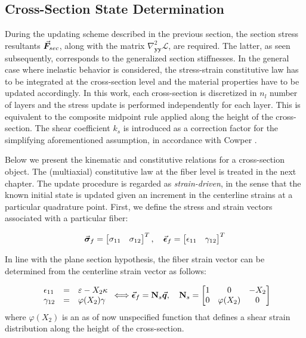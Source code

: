 \subsection{Cross-Section State Determination}\label{subsection:CH2-S4SS5}

During the updating scheme described in the previous section, the section stress
resultants $\vec{\bm{F}}_{sec}$, along with the matrix
$\nabla_{\mathbf{yy}}^2\mathcal{L}$, are required. The latter, as seen
subsequently, corresponds to the generalized section stiffnesses. In the general
case where
inelastic behavior is considered, the stress-strain constitutive law has to be
integrated at the cross-section level and the material properties have to be
updated accordingly. In this work, each cross-section is discretized in $n_l$
number of layers and the stress update is performed independently for each 
layer.
This is equivalent to the composite midpoint rule applied along the height of
the cross-section. The shear coefficient $k_s$ is
introduced as a correction factor for the simplifying aforementioned assumption,
in accordance with Cowper \cite{Cowper}.

Below we present the kinematic and constitutive relations for a cross-section 
object. The (multiaxial) constitutive law at the fiber level is treated in the 
next chapter. The update
procedure is regarded as \emph{strain-driven}, in the sense that the known
initial state is updated given an increment in the centerline strains at a 
particular quadrature point. First, we define the stress and strain vectors 
associated with a particular fiber:

\begin{equation}
	\vec{\bm{\sigma}}_f = \begin{bmatrix}
		\sigma_{11} &  \sigma_{12}
	\end{bmatrix}^T,\quad
	\vec{\bm{\epsilon}}_f = \begin{bmatrix}
		\epsilon_{11}  & \gamma_{12}
	\end{bmatrix}^T
	\label{eq:FIBER_VECTOR_NOTATIONS}
\end{equation}

In line with the plane section hypothesis, the fiber strain vector can be 
determined from the centerline strain vector as follows:

\begin{equation}
	\begin{array}{lcl}
		\epsilon_{11} & = &\varepsilon-X_2\kappa \\
		\gamma_{12} &= &\varphi(X_2)\gamma
	\end{array}
	\Longleftrightarrow \vec{\bm{\epsilon}}_f = \mathbf{N}_s\vec{\bm{q}},\quad \mathbf{N}_s 
	=
	\begin{bmatrix}
		1 & 0 & -X_2\\
		0 & \varphi(X_2) & 0
	\end{bmatrix}
	\label{eq:SECTION_KIN}
\end{equation}
\noindent where $\varphi(X_2)$ is an as of now unspecified function that defines
a shear strain distribution along the height of the cross-section.

